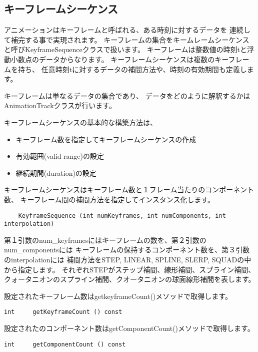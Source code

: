 \subsection{キーフレームシーケンス}

アニメーションはキーフレームと呼ばれる、ある時刻に対するデータを
連続して補完する事で実現されます。
キーフレームの集合をキームレームシーケンスと呼びKeyframeSequenceクラスで扱います。
キーフレームは整数値の時刻tと浮動小数点のデータからなります。
キーフレームシーケンスは複数のキーフレームを持ち、
任意時刻tに対するデータの補間方法や、時刻の有効期間も定義します。

キーフレームは単なるデータの集合であり、
データをどのように解釈するかはAnimationTrackクラスが行います。

キーフレームシーケンスの基本的な構築方法は、

\begin{itemize}
\item キーフレーム数を指定してキーフレームシーケンスの作成
\item 有効範囲(valid range)の設定
\item 継続期間(duration)の設定
\end{itemize}


キーフレームシーケンスはキーフレーム数と１フレーム当たりのコンポーネント数、
キーフレーム間の補間方法を指定してインスタンス化します。

\begin{verbatim}
 	KeyframeSequence (int numKeyframes, int numComponents, int interpolation)
\end{verbatim}

第１引数のnum\_keyframesにはキーフレームの数を、第２引数のnum\_componentsには
キーフレームの保持するコンポーネント数を、第３引数のinterpolationには
補間方法をSTEP, LINEAR, SPLINE, SLERP, SQUADの中から指定します。
それぞれSTEPがステップ補間、線形補間、スプライン補間、
クォータニオンのスプライン補間、クオータニオンの球面線形補間を表します。

設定されたキーフレーム数はgetkeyframeCount()メソッドで取得します。

\begin{verbatim}
int 	getKeyframeCount () const
\end{verbatim}

設定されたのコンポーネント数はgetComponentCount()メソッドで取得します。

\begin{verbatim}
int 	getComponentCount () const
\end{verbatim}

